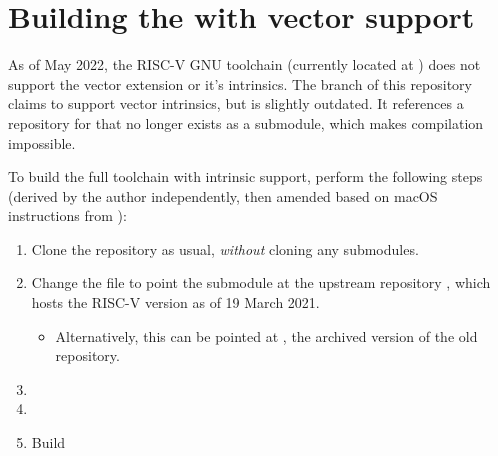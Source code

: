\chapter{Building the  with vector support}\label{appx:building_rvv_gcc_toolchain}

As of May 2022, the RISC-V GNU toolchain (currently located at ) does not support the vector extension or it's intrinsics.
The  branch of this repository claims to support vector intrinsics, but is slightly outdated.
It references a repository for  that no longer exists as a submodule, which makes compilation impossible.

To build the full toolchain with intrinsic support, perform the following steps (derived by the author independently, then amended based on macOS instructions from ):
\begin{enumerate}
    \item Clone the repository as usual, \emph{without} cloning any submodules.
    \item Change the  file to point the  submodule at the upstream  repository , which hosts the RISC-V version as of 19 March 2021.
    
    \begin{itemize}
        \item Alternatively, this can be pointed at , the archived version of the old repository.
    \end{itemize}
    
    \item {}
    \item {}
    \item Build
\end{enumerate}


